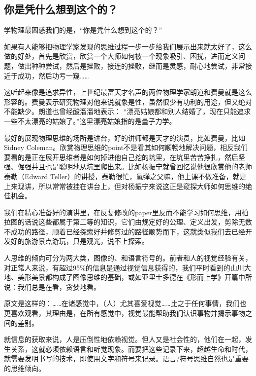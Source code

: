 

\subsection{你是凭什么想到这个的？}

学物理最困惑我们的是，“你是凭什么想到这个的？”

如果有人能够把物理学家发现的思维过程一步一步给我们展示出来就太好了，这么做的好处，首先是欣赏，欣赏一个大师如何被一个现象吸引、困扰，进而定义问题，做出种种尝试，然后是挫败，接连的挫败，继而是灵感，耐心地尝试，非常接近于成功，然后功亏一窥……

这听起来像是追求异性，上世纪最富天才名声的两位物理学家朗道和费曼就是这么形容的。费曼表示研究物理对他来说就象是性，虽然很少有功利的用途，但又绝对不能缺少。朗道也曾经酸溜溜地表示： “漂亮姑娘都和别人结婚了，现在只能追求一些不太漂亮的姑娘了。”这里漂亮姑娘指的是量子力学。


最好的展现物理思维的场所是讲台，好的讲师都是天才的演员，比如费曼，比如Sidney Coleman。欣赏物理思维的point不是看其如何顺畅地解决问题，相反我们要看的是正在展开思维者是如何掉进他自己挖的坑里，在坑里苦苦挣扎，然后坚强、倔强并且也是聪明地从坑里爬出来。比如杨振宁就曾回忆说他很欣赏他的老师泰勒（Edward Teller）的讲授，泰勒很忙，氢弹之父嘛，他上课不做准备，就是上来现讲，所以常常被挂在讲台上，但对杨振宁来说这正是窥探大师如何思维的绝佳机会。

我们在精心准备好的演讲里，在反复修改的paper里反而不能学习如何思维，用柏拉图的话说这些都属于第二等的知识，它们由规定好的公理、定义出发，剪除无数不成功的路径，顺着已经探索好并修剪过的路径顺势而下，这就类似我们去已经开发好的旅游景点游玩，只是观光，说不上探索。

人思维的倾向可分为两大类，图像的、和语言符号的。前者和人的视觉经验有关，对正常人来说，有超过95\%的信息是通过视觉信息获得的，我们平时看到的山川大地、美形美景都构成了图像思维的基础，或如亚里士多德在《形而上学》开篇中所说：我们总是在看，贪婪地看。

原文是这样的：……在诸感觉中，（人）尤其喜爱视觉……比之于任何事情，我们也更喜欢观看，其理由是，在所有感觉中，视觉最能帮助我们认识事物并揭示事物之间的差别。

就信息的获取来说，人是压倒性地依赖视觉。但人又是社会性的，他们在一起，发生关系，这就必须依赖语言和听觉现象。而要把这些记录下来，超越生命和时代，就需要发明书写的技术，即使用文字和符号来记录。语言/符号思维自然也是重要的思维倾向。

